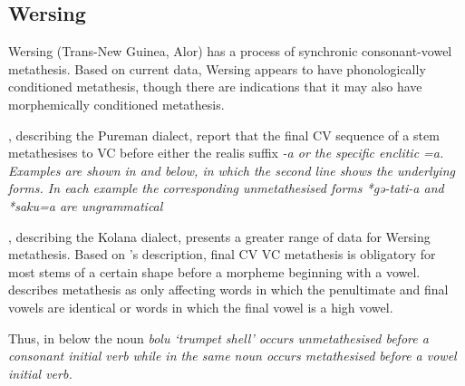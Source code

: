 \subsection{Wersing}\label{sec:Wer}
Wersing (Trans-New Guinea, Alor) has a process of
synchronic consonant-vowel metathesis.
Based on current data, Wersing appears to have phonologically
conditioned metathesis, though there are indications
that it may also have morphemically conditioned metathesis.

\cite{sche14}, describing the Pureman dialect,
report that the final CV sequence
of a stem metathesises to VC before
either the realis suffix \it{-a} or the specific enclitic \it{=a}.
Examples are shown in  and  below,
in which the second line shows the underlying forms.
In each example the corresponding unmetathesised forms \it{*gə-tati-a}
and \it{*saku=a} are ungrammatical

\begin{multicols}{2}
\let\eachwordone=\it
	\begin{exe}
		\label{ex:WerMet1}
		\label{ex:WerMet2}
	\end{exe}
\end{multicols}

\cite{ba18}, describing the Kolana dialect,
presents a greater range of data for Wersing metathesis.
Based on \citeauthor{ba18}'s description,
final CV {\ra} VC metathesis is obligatory
for most stems of a certain shape before
a morpheme beginning with a vowel.
\citeauthor{ba18} describes metathesis as only affecting
words in which the penultimate and final vowels are identical
or words in which the final vowel is a high vowel.

Thus, in  below the noun \it{bolu}
`trumpet shell' occurs unmetathesised before a
consonant initial verb while in 
the same noun occurs metathesised before a vowel initial verb.

\begin{exe}
\let\eachwordone=\it
	\label{ex:bolu}
	\label{ex:boul}
\end{exe}

